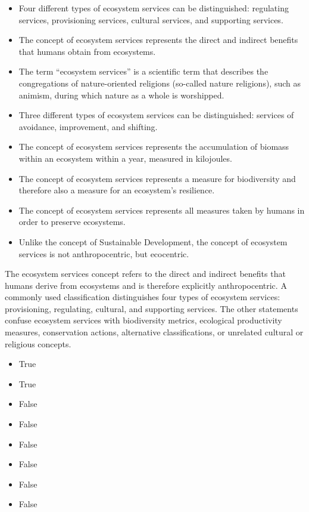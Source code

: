 \documentclass[
  a4paper,
  DIV=11,
  numbers=noendperiod,
  oneside,
  openany]{scrreprt}
\providecommand{\tightlist}{%
  \setlength{\itemsep}{0pt}\setlength{\parskip}{0pt}}
\begin{document}
\begin{itemize}
\tightlist
\item[$\square$]
  Four different types of ecosystem services can be distinguished:
  regulating services, provisioning services, cultural services, and
  supporting services.
\item[$\square$]
  The concept of ecosystem services represents the direct and indirect
  benefits that humans obtain from ecosystems.
\item[$\square$]
  The term ``ecosystem services'' is a scientific term that describes
  the congregations of nature-oriented religions (so-called nature
  religions), such as animism, during which nature as a whole is
  worshipped.
\item[$\square$]
  Three different types of ecosystem services can be distinguished:
  services of avoidance, improvement, and shifting.
\item[$\square$]
  The concept of ecosystem services represents the accumulation of
  biomass within an ecosystem within a year, measured in kilojoules.
\item[$\square$]
  The concept of ecosystem services represents a measure for
  biodiversity and therefore also a measure for an ecosystem's
  resilience.
\item[$\square$]
  The concept of ecosystem services represents all measures taken by
  humans in order to preserve ecosystems.
\item[$\square$]
  Unlike the concept of Sustainable Development, the concept of
  ecosystem services is not anthropocentric, but ecocentric.
\end{itemize}

The ecosystem services concept refers to the direct and indirect
benefits that humans derive from ecosystems and is therefore explicitly
anthropocentric. A commonly used classification distinguishes four types
of ecosystem services: provisioning, regulating, cultural, and
supporting services. The other statements confuse ecosystem services
with biodiversity metrics, ecological productivity measures,
conservation actions, alternative classifications, or unrelated cultural
or religious concepts.

\begin{itemize}
\tightlist
\item
  True
\item
  True
\item
  False
\item
  False
\item
  False
\item
  False
\item
  False
\item
  False
\end{itemize}
\end{document}
